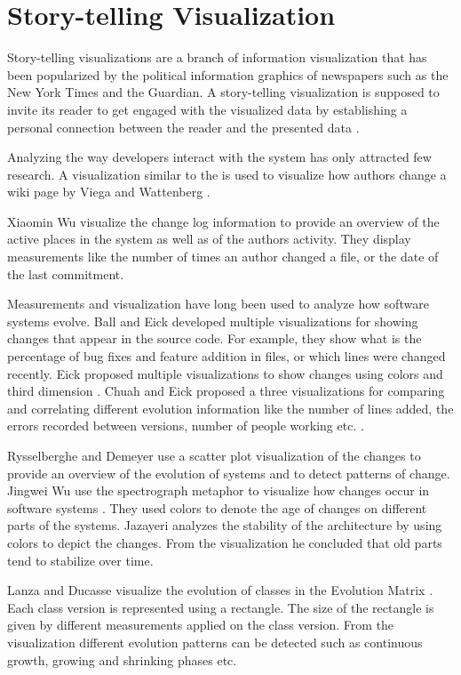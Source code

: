 \section{Story-telling Visualization}

Story-telling visualizations are a branch of information visualization that has been popularized by the political information graphics of newspapers such as the New York Times and the Guardian. A story-telling visualization is supposed to invite its reader to get engaged with the visualized data by establishing a personal connection between the reader and the presented data \cite{Sege10a}. 

Analyzing the way developers interact with the system has only attracted few research. A visualization similar to the \omap is used to visualize how authors change a wiki page by Viega and Wattenberg \cite{Vieg04a}.

Xiaomin Wu \etal visualize \cite{Wu04b} the change log information to provide an overview of the active places in the system as well as of the authors activity. They display measurements like the number of times an author changed a file, or the date of the last commitment.

Measurements and visualization have long been used to analyze how software systems evolve.
%
Ball and Eick \cite{Ball96a} developed multiple visualizations for showing changes that appear in the source code. For example, they show what is the percentage of bug fixes and feature addition in files, or which lines were changed recently.
%
Eick \etal proposed multiple visualizations to show changes using colors and third dimension \cite{Eick02a}.
%
Chuah and Eick proposed a three visualizations for comparing and correlating different evolution information like the number of lines added, the errors recorded between versions, number of people working etc. \cite{Chua98a}.

Rysselberghe and Demeyer use a scatter plot visualization of the changes  to provide an overview of the evolution of systems and to detect patterns of change\cite{Ryss04a}.
%
Jingwei Wu \etal use the spectrograph metaphor to visualize how changes occur in software systems \cite{Wu04a}. They used colors to denote the age of changes on different parts of the systems.
%
Jazayeri analyzes the stability of the architecture \cite{Jaza02a} by using colors to depict the changes. From the visualization he concluded that old parts tend to stabilize over time.

Lanza and Ducasse visualize the evolution of classes in the Evolution Matrix \cite{Lanz02a}. Each class version is represented using a rectangle. The size of the rectangle is given by different measurements applied on the class version. From the visualization different evolution patterns can be detected such as continuous growth, growing and shrinking phases etc.

